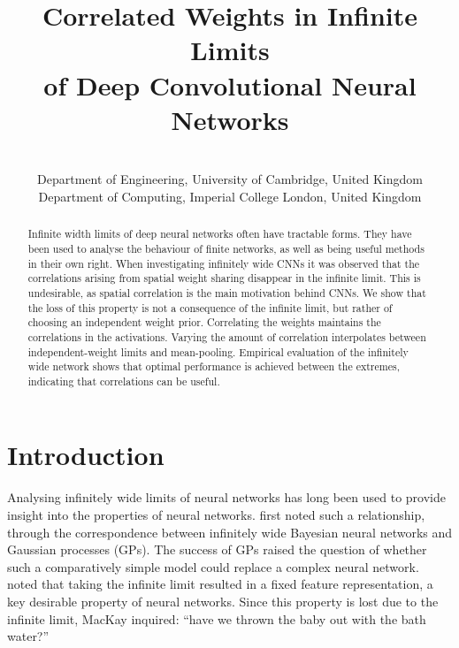 \documentclass[tablecaption=bottom,wcp,nonatbib]{jmlr} %
\title[Correlated Weights in Infinite Limits of Deep CNNs]{Correlated Weights in Infinite Limits \\ of Deep Convolutional Neural Networks}
\author{\Name{Adrià Garriga-Alonso} \Email{ag919@cam.ac.uk}\\
 \addr Department of Engineering, University of Cambridge, United Kingdom
 \AND
 \Name{Mark {van der Wilk}} \Email{m.vdwilk@imperial.ac.uk}\\
 \addr Department of Computing, Imperial College London, United Kingdom
}
\begin{document}
\maketitle

\begin{abstract}
Infinite width limits of deep neural networks often have tractable forms. They have been used to analyse the behaviour of finite networks, as well as being useful methods in their own right. When investigating infinitely wide CNNs it was observed that the correlations arising from spatial weight sharing disappear in the infinite limit.
This is undesirable, as spatial correlation is the main motivation behind CNNs. We show that the loss of this property is not a consequence of the infinite limit, but rather of choosing an independent weight prior. Correlating the weights maintains the correlations in the activations. 
Varying the amount of correlation interpolates between independent-weight limits and mean-pooling. Empirical evaluation of the infinitely wide network shows that optimal performance is achieved between the extremes, indicating that correlations can be useful.
\end{abstract}


\section{Introduction}
Analysing infinitely wide limits of neural networks has long been used to provide insight into the properties of neural networks.
\citet{neal1996bayesian} first noted such a relationship, through the correspondence between infinitely wide Bayesian neural networks and Gaussian processes (GPs). 
The success of GPs raised the question of whether such a comparatively simple model could replace a complex neural network. \citet{mackay1998introgp} noted that taking the infinite limit resulted in a fixed feature representation, a key desirable property of neural networks. Since this property is lost due to the infinite limit, MacKay inquired: ``have we thrown the baby out with the bath water?''
\end{document}

